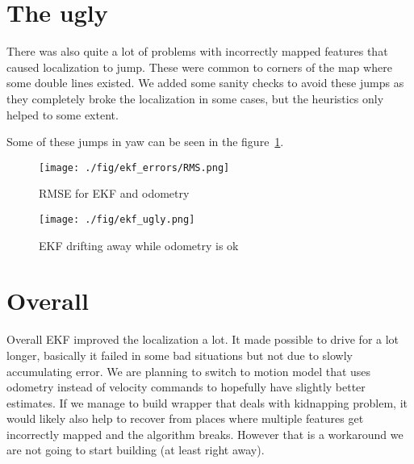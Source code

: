 \documentclass[12pt, a4paper, onecolumn]{article}
\begin{document}
\newpage
\section{The ugly}

There was also quite a lot of problems with incorrectly mapped features that caused localization to jump.
These were common to corners of the map where some double lines existed.
We added some sanity checks to avoid these jumps as they completely broke the localization in some cases, but the heuristics only helped to some extent.

Some of these jumps in yaw can be seen in the figure~\ref{fig:rmse}.

\begin{figure}[h!]
  \begin{center}
    \texttt{[image: ./fig/ekf\_errors/RMS.png]}
  \end{center}
  \caption{RMSE for EKF and odometry}
  \label{fig:rmse}
\end{figure}
\begin{figure}[h!]
  \begin{center}
    \texttt{[image: ./fig/ekf\_ugly.png]}
  \end{center}
  \caption{EKF drifting away while odometry is ok}
  \label{fig:ekf_ugly}
\end{figure}

\newpage
\section{Overall}
Overall EKF improved the localization a lot.
It made possible to drive for a lot longer, basically it failed in some bad situations but not due to slowly accumulating error.
We are planning to switch to motion model that uses odometry instead of velocity commands to hopefully have slightly better estimates.
If we manage to build wrapper that deals with kidnapping problem, it would likely also help to recover from places where multiple features get incorrectly
mapped and the algorithm breaks.
However that is a workaround we are not going to start building (at least right away).
\end{document}
